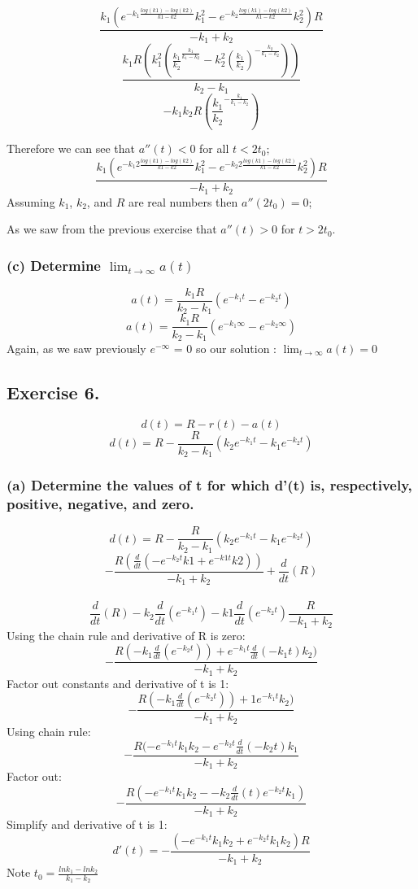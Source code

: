 \documentclass[]{article}
\begin{document}
\[\frac{k_1(e^{-k_1 \frac{log(k1) - log(k2)}{k1 - k2}}k_1^2-e^{-k_2 \frac{log(k1) - log(k2)}{k1 - k2}}k_2^2)R}{-k_1+k_2}\]
\[\frac{k_1 R(k_1^2(\frac{k_1}{k_2}^{\frac{k_1}{k_1 - k_2}} - k_2^2(\frac{k_1}{k_2})^{-\frac{k_2}{k_1 - k_2}}))}{k_2 - k_1}\]
\[-k_1 k_2 R (\frac{k_1}{k_2}^{-\frac{k_1}{k_1 - k_2}})\]

Therefore we can see that \(a''(t) < 0\) for all \(t < 2t_0\);
\[\frac{k_1(e^{-k_1 2 \frac{log(k1) - log(k2)}{k1 - k2}}k_1^2-e^{-k_2 2\frac{log(k1) -log(k2)}{k1 - k2}}k_2^2)R}{-k_1+k_2}\]
Assuming \(k_1\), \(k_2\), and \(R\) are real numbers then
\(a''(2t_0) =0\);

As we saw from the previous exercise that \(a''(t) > 0\) for
\(t > 2t_0\).

\subsubsection{\texorpdfstring{(c) Determine
\(\lim_{t\to\infty}a(t)\)}{(c) Determine \textbackslash{}lim\_\{t\textbackslash{}to\textbackslash{}infty\}a(t)}}\label{c-determine-lim_ttoinftyat}

\[a(t) = \frac{k_1 R}{k_2-k_1}(e^{-k_1t} - e^{-k_2t})\]
\[a(t) = \frac{k_1 R}{k_2-k_1}(e^{-k_1 \infty} - e^{-k_2 \infty})\]
Again, as we saw previously \(e^{-\infty}\) = 0 so our solution :
\(\lim_{t\to\infty}a(t) =0\)

\subsection{Exercise 6.}\label{exercise-6.}

\[d(t) = R - r(t) - a(t)\]
\[d(t) = R - \frac{R}{k_2 - k_1}(k_2 e ^{-k_1 t} - k_1 e^{-k_2 t})\]

\subsubsection{(a) Determine the values of t for which d'(t) is,
respectively, positive, negative, and
zero.}\label{a-determine-the-values-of-t-for-which-dt-is-respectively-positive-negative-and-zero.}

\[d(t) = R - \frac{R}{k_2 - k_1}(k_2 e ^{-k_1 t} - k_1 e^{-k_2 t})\]
\[- \frac{R (\frac{d}{dt} (-e^{-k_2 t} k1 + e^{-k1t}k2))}{-k_1 + k_2} + \frac{d}{dt} (R)\]\\
\[\frac{d}{dt}(R) - k_2 \frac{d}{dt}(e^{-k_1 t})-k1\frac{d}{dt}(e^{-k_2 t})\frac{R}{-k_1 + k_2}\]
Using the chain rule and derivative of R is zero:
\[- \frac{R(-k_1 \frac{d}{dt}(e^{-k_2 t})) + e^{-k_1 t}\frac{d}{dt}(-k_1 t)k_2)}{-k_1 + k_2}\]
Factor out constants and derivative of t is 1:
\[- \frac{R(-k_1 \frac{d}{dt}(e^{-k_2 t})) + 1e^{-k_1 t}k_2)}{-k_1 + k_2}\]
Using chain rule:
\[- \frac{R(-e^{-k_1 t}k_1 k_2 - e^{-k_2 t} \frac{d}{dt} (-k_2 t)k_1}{-k_1 + k_2}\]
Factor out:
\[- \frac{R(-e^{-k_1 t}k_1 k_2 - -k_2 \frac{d}{dt}(t)e^{-k_2 t}k_1)}{-k_1 + k_2}\]
Simplify and derivative of t is 1:
\[d'(t) = -\frac{(-e^{-k_1 t}k_1 k_2 + e^{-k_2 t}k_1 k_2)R}{-k_1 + k_2}\]
Note \(t_0 = \frac{ln k_1 - ln k_2}{k_1 - k_2}\)
\end{document}
